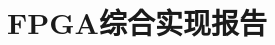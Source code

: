 \documentclass[UTF8]{ctexart}
\begin{document}
	\section{FPGA综合实现报告}
	\begin{comment}

	\textsuperscript{\footnotesize\cite{shitailong}}


	\begin{thebibliography}{99}
\bibitem{shitailong}


\begin{thebibliography}{99}
\bibitem{shitailong}
史泰龙. 胶体量子点短波红外探测器的器件物理研究[D]. 湖北:华中科技大学,2021.
\bibitem{zongshu1}
马润泽，张晓明，冯帅，等.红外光电探测技术研究现状及展望（特邀）［J］.光子学报，2021，50（10）：1004006
\bibitem{zongshu2}
李汝劼,唐利斌,张玉平,赵清.红外量子点及其光电探测器研究进展[J].红外技术,2020,42(5):405-419
\bibitem{art1}
Tiande Liu.Room-temperature infrared photodetectors with hybrid structure based on two-dimensional materials[J].《Chinese Physics B》,2019
\bibitem{art2}
尉鹏举.InAs/GaSbⅡ类超晶格多色红外探测器降低串音影响的研究进展[J].《真空与低温》,2025
\end{thebibliography}


史泰龙. 胶体量子点短波红外探测器的器件物理研究[D]. 湖北:华中科技大学,2021.

\end{thebibliography}
\begin{figure}[h]
	\centering
	\texttt{[image: sbq2.png]}
	\caption{DIRS=1正向循环仿真}	
\end{figure}

\begin{itemize}
		\item 在线上实习中学习了反相器制作工艺的相关知识。
		\item 在线上实习中体验了光刻工艺的全流程，了解了光刻工艺的基本原理和步骤。
		\item 在线下实习中参与了与量子点红外芯片成像相关的讲座，了解了量子点红外芯片的基本原理和应用。
		\item 走进了实验室，学习了PbS CQD 红外探测器的制备的部分工艺步骤。
		\item 自主对相关前沿知识进行了学习。
	\end{itemize}

	\begin{table}[h!]
		\begin{center}
			\caption{实验所需的元器件}
			\setlength{\tabcolsep}{20pt}
			\begin{tabular}{c c c}
				\toprule
				\textbf {名称} & \textbf {型号（参数）} & \textbf {数量}\\
				\midrule
				\textbf{FPGA开发板} 	&  Digilentt Basys2 & 1片\\
				\bottomrule
			\end{tabular}
		\end{center}
	\end{table}

	(Get-Content .\数电实验1.tex | Measure-Object -Character).Characters



		\end{comment}
\end{document}
